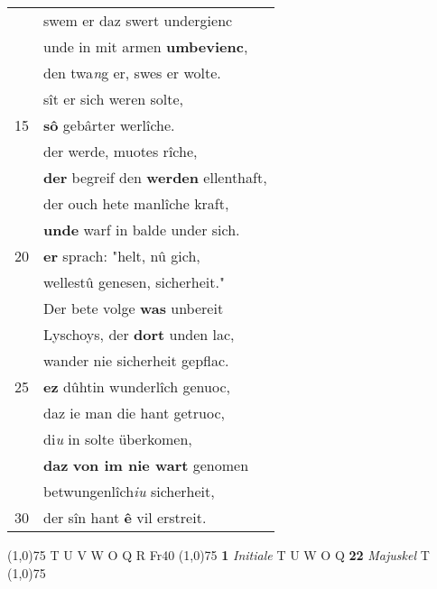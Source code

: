 \documentclass[8pt,a4paper,notitlepage]{article}
\begin{document}
\begin{table}[ht]
\begin{minipage}[t]{0.5\linewidth}
\begin{tabular}{rl}
 & swem er daz swert undergienc\\ 
 & unde in mit armen \textbf{umbevienc},\\ 
 & den twa\textit{n}g er, swes er wolte.\\ 
 & sît er sich weren solte,\\ 
15 & \textbf{sô} gebârter werlîche.\\ 
 & der werde, muotes rîche,\\ 
 & \textbf{der} begreif den \textbf{werden} ellenthaft,\\ 
 & der ouch hete manlîche kraft,\\ 
 & \textbf{unde} warf in balde under sich.\\ 
20 & \textbf{er} sprach: "helt, nû gich,\\ 
 & wellestû genesen, sicherheit."\\ 
 & Der bete volge \textbf{was} unbereit\\ 
 & Lyschoys, der \textbf{dort} unden lac,\\ 
 & wander nie sicherheit gepflac.\\ 
25 & \textbf{ez} dûhtin wunderlîch genuoc,\\ 
 & daz ie man die hant getruoc,\\ 
 & di\textit{u} in solte überkomen,\\ 
 & \textbf{daz} \textbf{von im nie wart} genomen\\ 
 & betwungenlîch\textit{iu} sicherheit,\\ 
30 & der sîn hant \textbf{ê} vil erstreit.\\ 
\end{tabular}
\scriptsize
\line(1,0){75} \newline
T U V W O Q R Fr40 \newline
\line(1,0){75} \newline
\textbf{1} \textit{Initiale} T U W O Q  \textbf{22} \textit{Majuskel} T  \newline
\line(1,0){75} \newline

\end{minipage}
\end{table}
\end{document}
